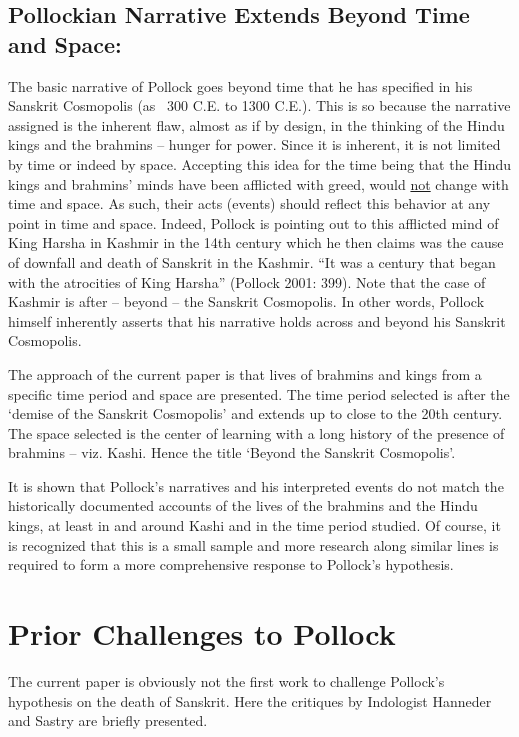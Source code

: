 \subsection*{Pollockian Narrative Extends Beyond Time and Space:}

The basic narrative of Pollock goes beyond time that he has specified in his Sanskrit Cosmopolis (as ~300 C.E. to 1300 C.E.). This is so because the narrative assigned is the inherent flaw, almost as if by design, in the thinking of the Hindu kings and the brahmins – hunger for power. Since it is inherent, it is not limited by time or indeed by space. Accepting this idea for the time being that the Hindu kings and brahmins’ minds have been afflicted with greed, would \underline{not} change with time and space. As such, their acts (events) should reflect this behavior at any point in time and space. Indeed, Pollock is pointing out to this afflicted mind of King Harsha in Kashmir in the 14th century which he then claims was the cause of downfall and death of Sanskrit in the Kashmir. “It was a century that began with the atrocities of King Harsha” (Pollock 2001: 399). Note that the case of Kashmir is after – beyond – the Sanskrit Cosmopolis. In other words, Pollock himself inherently asserts that his narrative holds across and beyond his Sanskrit Cosmopolis.

The approach of the current paper is that lives of brahmins and kings from a specific time period and space are presented. The time period selected is after the ‘demise of the Sanskrit Cosmopolis’ and extends up to close to the 20th century. The space selected is the center of learning with a long history of the presence of brahmins – viz. Kashi. Hence the title ‘Beyond the Sanskrit Cosmopolis’.

It is shown that Pollock’s narratives and his interpreted events do not match the historically documented accounts of the lives of the brahmins and the Hindu kings, at least in and around Kashi and in the time period studied. Of course, it is recognized that this is a small sample and more research along similar lines is required to form a more comprehensive response to Pollock’s hypothesis.


\section*{Prior Challenges to Pollock}

The current paper is obviously not the first work to challenge Pollock’s hypothesis on the death of Sanskrit. Here the critiques by Indologist Hanneder and Sastry are briefly presented.

